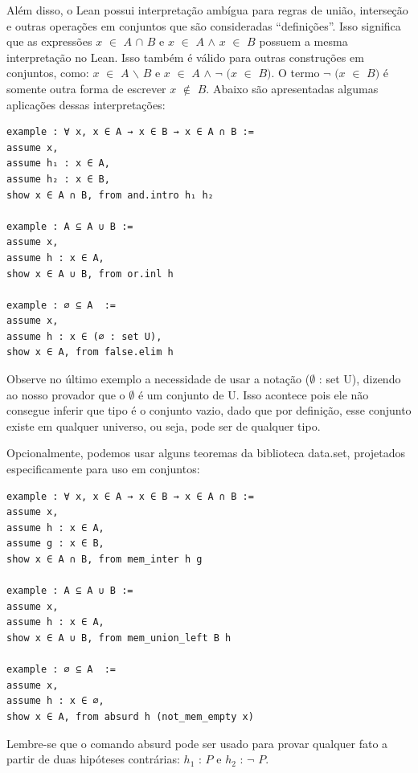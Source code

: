 Além disso, o Lean possui interpretação ambígua para regras de união, interseção e outras operações em conjuntos que são consideradas “definições”. Isso significa que as expressões $x$ $\in$ $A$ $\cap$ $B$ e $x$ $\in$ $A$ $\wedge$ $x$ $\in$ $B$ possuem a mesma interpretação no Lean. Isso também é válido para outras construções em conjuntos, como: $x$ $\in$ $A$ $\backslash $ $B$ e $x$ $\in$ $A$ $\wedge$ $\neg$ $(x$ $\in$ $B)$. O termo $\neg$ $(x$ $\in$ $B)$ é somente outra forma de escrever $x$ $\notin$ $B$. Abaixo são apresentadas algumas aplicações dessas interpretações:

\begin{lstlisting}
example : ∀ x, x ∈ A → x ∈ B → x ∈ A ∩ B :=
assume x,
assume h₁ : x ∈ A,
assume h₂ : x ∈ B,
show x ∈ A ∩ B, from and.intro h₁ h₂

example : A ⊆ A ∪ B :=
assume x,
assume h : x ∈ A,
show x ∈ A ∪ B, from or.inl h

example : ∅ ⊆ A  :=
assume x,
assume h : x ∈ (∅ : set U),
show x ∈ A, from false.elim h \end{lstlisting}

Observe no último exemplo a necessidade de usar a notação { \selectfont ($\emptyset$ : set U)}, dizendo ao nosso provador que o $\emptyset$ é um conjunto de{
\selectfont U}. Isso acontece pois ele não consegue inferir que tipo é o conjunto vazio, dado que por definição, esse conjunto existe em qualquer universo, ou seja, pode ser de qualquer tipo.

Opcionalmente, podemos usar alguns teoremas da biblioteca {
\selectfont data.set}, projetados especificamente para uso em conjuntos:

\begin{lstlisting}
example : ∀ x, x ∈ A → x ∈ B → x ∈ A ∩ B :=
assume x,
assume h : x ∈ A,
assume g : x ∈ B,
show x ∈ A ∩ B, from mem_inter h g

example : A ⊆ A ∪ B :=
assume x,
assume h : x ∈ A,
show x ∈ A ∪ B, from mem_union_left B h

example : ∅ ⊆ A  :=
assume x,
assume h : x ∈ ∅,
show x ∈ A, from absurd h (not_mem_empty x) \end{lstlisting}

Lembre-se que o comando{
\selectfont absurd} pode ser usado para provar qualquer fato a partir de duas hipóteses contrárias: $h_1$ : $P$ e $h_2$ : $\neg$ $P$.

